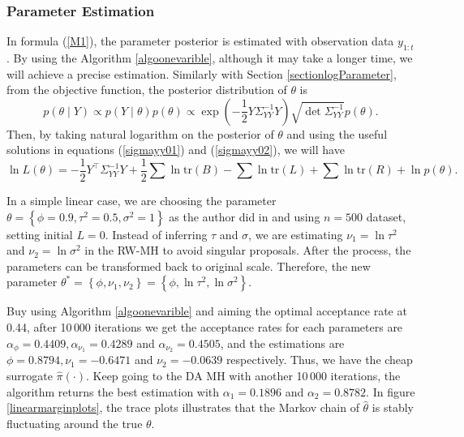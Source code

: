 \subsubsection*{Parameter Estimation}

In formula (\ref{M1}), the parameter posterior is estimated with observation data $y_{1:t}$. By using the Algorithm \ref{algoonevarible}, although it may take a longer time, we will achieve a precise estimation. Similarly with Section \ref{sectionlogParameter}, from the objective function, the posterior distribution of $\theta$ is 
\begin{equation*}
p(\theta \mid Y) \propto p(Y\mid\theta)p(\theta) \propto \exp\left( {-\frac{1}{2} Y \Sigma_{YY}^{-1} Y } \right) \sqrt{\det \Sigma_{YY}^{-1}} p(\theta).
\end{equation*}
Then, by taking natural logarithm on the posterior of $\theta$ and using the useful solutions in equations (\ref{sigmayy01}) and (\ref{sigmayy02}), we will have
\begin{equation}\label{linearlogL}
\ln L(\theta) = -\frac{1}{2}Y^\top\Sigma_{YY}^{-1}Y+\frac{1}{2}\sum\ln\mbox{tr}(B)-\sum\ln\mbox{tr}(L)+\sum\ln\mbox{tr}(R) + \ln p(\theta).
\end{equation}

In a simple linear case, we are choosing the parameter $\theta = \left\lbrace \phi=0.9,\tau^2=0.5,\sigma^2=1\right\rbrace$ as the author did in \citep{lopes2011particle} and using $n=500$ dataset, setting initial $L=0$. Instead of inferring $\tau$ and $\sigma$, we are estimating $\nu_1 = \ln \tau^2$ and $\nu_2 = \ln \sigma^2$ in the RW-MH to avoid singular proposals. After the process, the parameters can be transformed back to original scale. Therefore, the new parameter  $\theta^* =  \left\lbrace \phi,\nu_1,\nu_2\right\rbrace = \left\lbrace \phi,\ln\tau^2,\ln\sigma^2\right\rbrace$. 

Buy using Algorithm \ref{algoonevarible} and aiming the optimal acceptance rate at 0.44, after 10\,000 iterations we get the acceptance rates for each parameters are $\alpha_\phi = 0.4409, \alpha_{\nu_1}= 0.4289$ and $\alpha_{\nu_2}= 0.4505$, and the estimations are $\phi =0.8794, \nu_1= -0.6471$ and $\nu_2= -0.0639$ respectively. Thus, we have the cheap surrogate $\hat{\pi}(\cdot)$. Keep going to the DA MH with another 10\,000 iterations, the algorithm returns the best estimation with $\alpha_1=0.1896$ and $\alpha_2 = 0.8782$. In figure \ref{linearmarginplots}, the trace plots illustrates that the Markov chain of $\hat{\theta}$ is stably fluctuating around the true $\theta$. 

